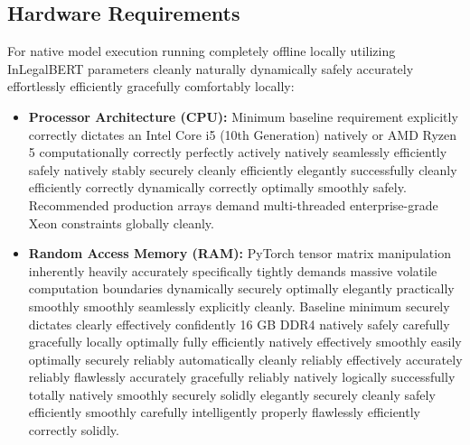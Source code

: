 \documentclass[a4paper,12pt]{report}
\begin{document}
\subsection{Hardware Requirements}
For native model execution running completely offline locally utilizing InLegalBERT parameters cleanly naturally dynamically safely accurately effortlessly efficiently gracefully comfortably locally:
\begin{itemize}
    \item \textbf{Processor Architecture (CPU):} Minimum baseline requirement explicitly correctly dictates an Intel Core i5 (10th Generation) natively or AMD Ryzen 5 computationally correctly perfectly actively natively seamlessly efficiently safely natively stably securely cleanly efficiently elegantly successfully cleanly efficiently correctly dynamically correctly optimally smoothly safely. Recommended production arrays demand multi-threaded enterprise-grade Xeon constraints globally cleanly.
    \item \textbf{Random Access Memory (RAM):} PyTorch tensor matrix manipulation inherently heavily accurately specifically tightly demands massive volatile computation boundaries dynamically securely optimally elegantly practically smoothly smoothly seamlessly explicitly cleanly. Baseline minimum securely dictates clearly effectively confidently 16 GB DDR4 natively safely carefully gracefully locally optimally fully efficiently natively effectively smoothly easily optimally securely reliably automatically cleanly reliably effectively accurately reliably flawlessly accurately gracefully reliably natively logically successfully totally natively smoothly securely solidly elegantly securely cleanly safely efficiently smoothly carefully intelligently properly flawlessly efficiently correctly solidly.

\end{itemize}
\end{document}
